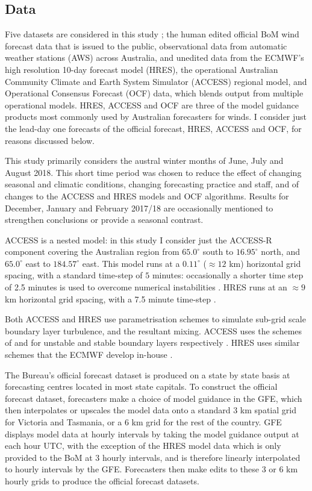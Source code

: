 \documentclass[twocol]{ametsoc}
\begin{document}
\subsection{Data}
Five datasets are considered in this study \citep{shortData19}; the human edited official BoM wind forecast data that is issued to the public, observational data from automatic weather stations (AWS) across Australia, and unedited data from the ECMWF's high resolution 10-day forecast model (HRES), the operational Australian Community Climate and Earth System Simulator (ACCESS) regional model, and Operational Consensus Forecast (OCF) data, which blends output from multiple operational models. HRES, ACCESS and OCF are three of the model guidance products most commonly used by Australian forecasters for winds. I consider just the lead-day one forecasts of the official forecast, HRES, ACCESS and OCF, for reasons discussed below. 

This study primarily considers the austral winter months of June, July and August 2018. This short time period was chosen to reduce the effect of changing seasonal and climatic conditions, changing forecasting practice and staff, and of changes to the ACCESS and HRES models and OCF algorithms. Results for December, January and February 2017/18 are occasionally mentioned to strengthen conclusions or provide a seasonal contrast. 

ACCESS is a nested model: in this study I consider just the ACCESS-R component covering the Australian region from $65.0^\circ$ south to $16.95^\circ$ north, and $65.0^\circ$ east to $184.57^\circ$ east. This model runs at a $0.11^\circ$ ($\approx 12$ km) horizontal grid spacing, with a standard time-step of $5$ minutes: occasionally a shorter time step of 2.5 minutes is used to overcome numerical instabilities \citep{bom16}. HRES runs at an $\approx 9$ km horizontal grid spacing, with a 7.5 minute time-step \citep{ecmwf19c}. 

Both ACCESS and HRES use parametrisation schemes to simulate sub-grid scale boundary layer turbulence, and the resultant mixing. ACCESS uses the schemes of \citet{lock00} and \citet{louis79} for unstable and stable boundary layers respectively \citep{bom10}. HRES uses similar schemes that the ECMWF develop in-house \citep{ecmwf19a}.

The Bureau's official forecast dataset is produced on a state by state basis at forecasting centres located in most state capitals. To construct the official forecast dataset, forecasters make a choice of model guidance in the GFE, which then interpolates or upscales the model data onto a standard 3 km spatial grid for Victoria and Tasmania, or a 6 km grid for the rest of the country. GFE displays model data at hourly intervals by taking the model guidance output at each hour UTC, with the exception of the HRES model data which is only provided to the BoM at 3 hourly intervals, and is therefore linearly interpolated to hourly intervals by the GFE. Forecasters then make edits to these 3 or 6 km hourly grids to produce the official forecast datasets.
\end{document}
